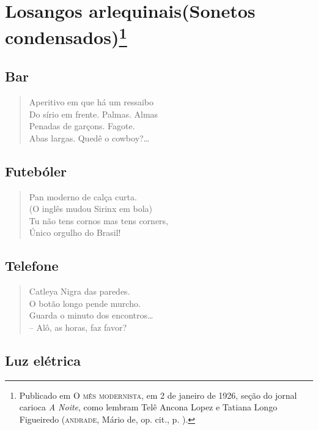\pagebreak
\section[Losangos arlequinais]{Losangos arlequinais\break(Sonetos condensados)\footnote[*]{Publicado em \textsc{O mês modernista}, em 2 de janeiro de 1926, seção do jornal carioca \emph{A
  Noite}, como lembram Telê Ancona Lopez e Tatiana Longo Figueiredo
  (\textsc{andrade}, Mário de, op. cit., p. ).}}

\subsection*{Bar}

\begin{verse}
Aperitivo em que há um ressaibo\\
Do sírio em frente. Palmas. Almas\\
Penadas de garçons. Fagote.\\
Abas largas. Quedê o cowboy?\ldots{}
\end{verse}

\medskip
\subsection*{Futebóler}

\begin{verse}
Pan moderno de calça curta.\\
(O inglês mudou Sirinx em bola)\\
Tu não tens cornos mas tens corners,\\
Único orgulho do Brasil!
\end{verse}

\medskip
\subsection*{Telefone}

\begin{verse}
Catleya Nigra das paredes.\\
O botão longo pende murcho.\\
Guarda o minuto dos encontros\ldots{}\\
-- Alô, as horas, faz favor?
\end{verse}


\medskip
\subsection*{Luz elétrica}

